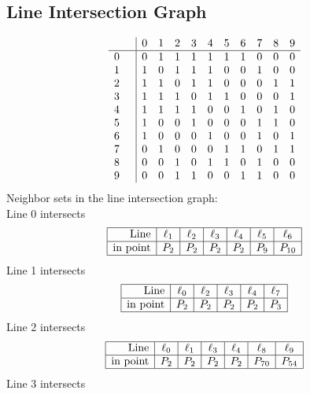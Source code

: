 \documentclass{article}
\begin{document}
{\subsection*{Line Intersection Graph}
{\arraycolsep=1pt
$$
\begin{array}{rr|*{10}r}
 &  & 0 & 1 & 2 & 3 & 4 & 5 & 6 & 7 & 8 & 9\\
\hline
0 &  & 0 & 1 & 1 & 1 & 1 & 1 & 1 & 0 & 0 & 0\\
1 &  & 1 & 0 & 1 & 1 & 1 & 0 & 0 & 1 & 0 & 0\\
2 &  & 1 & 1 & 0 & 1 & 1 & 0 & 0 & 0 & 1 & 1\\
3 &  & 1 & 1 & 1 & 0 & 1 & 1 & 0 & 0 & 0 & 1\\
4 &  & 1 & 1 & 1 & 1 & 0 & 0 & 1 & 0 & 1 & 0\\
5 &  & 1 & 0 & 0 & 1 & 0 & 0 & 0 & 1 & 1 & 0\\
6 &  & 1 & 0 & 0 & 0 & 1 & 0 & 0 & 1 & 0 & 1\\
7 &  & 0 & 1 & 0 & 0 & 0 & 1 & 1 & 0 & 1 & 1\\
8 &  & 0 & 0 & 1 & 0 & 1 & 1 & 0 & 1 & 0 & 0\\
9 &  & 0 & 0 & 1 & 1 & 0 & 0 & 1 & 1 & 0 & 0\\
\end{array}
$$
}%
Neighbor sets in the line intersection graph:\\
Line 0 intersects 
$$
\begin{array}{|r*{6}{|c}|}
\hline
\mbox{Line}  & \ell_{1} & \ell_{2} & \ell_{3} & \ell_{4} & \ell_{5} & \ell_{6}\\
\hline
\mbox{in point}  & P_{2} & P_{2} & P_{2} & P_{2} & P_{9} & P_{10}\\
\hline
\end{array}
$$
Line 1 intersects 
$$
\begin{array}{|r*{5}{|c}|}
\hline
\mbox{Line}  & \ell_{0} & \ell_{2} & \ell_{3} & \ell_{4} & \ell_{7}\\
\hline
\mbox{in point}  & P_{2} & P_{2} & P_{2} & P_{2} & P_{3}\\
\hline
\end{array}
$$
Line 2 intersects 
$$
\begin{array}{|r*{6}{|c}|}
\hline
\mbox{Line}  & \ell_{0} & \ell_{1} & \ell_{3} & \ell_{4} & \ell_{8} & \ell_{9}\\
\hline
\mbox{in point}  & P_{2} & P_{2} & P_{2} & P_{2} & P_{70} & P_{54}\\
\hline
\end{array}
$$
Line 3 intersects 
$$
\begin{array}{|r*{6}{|c}|}

\end{array}$$}
\end{document}
